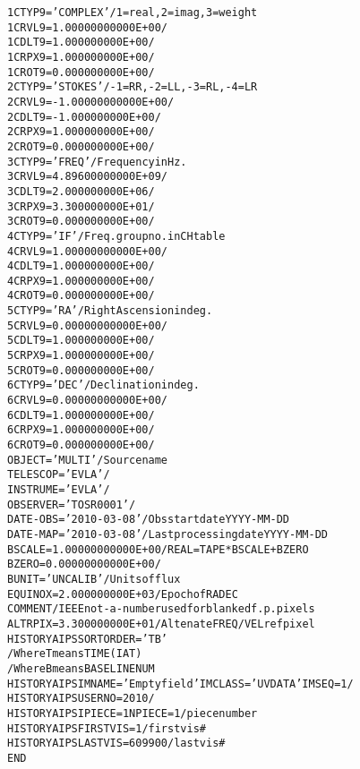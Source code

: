 \documentclass[twoside]{article}
\begin{document}
\begin{alltt}
1CTYP9  = 'COMPLEX '           / 1=real,2=imag,3=weight
1CRVL9  =    1.00000000000E+00 /
1CDLT9  =      1.000000000E+00 /
1CRPX9  =      1.000000000E+00 /
1CROT9  =      0.000000000E+00 /
2CTYP9  = 'STOKES  '           / -1=RR, -2=LL, -3=RL, -4=LR
2CRVL9  =   -1.00000000000E+00 /
2CDLT9  =     -1.000000000E+00 /
2CRPX9  =      1.000000000E+00 /
2CROT9  =      0.000000000E+00 /
3CTYP9  = 'FREQ    '           / Frequency in Hz.
3CRVL9  =    4.89600000000E+09 /
3CDLT9  =      2.000000000E+06 /
3CRPX9  =      3.300000000E+01 /
3CROT9  =      0.000000000E+00 /
4CTYP9  = 'IF      '           / Freq. group no. in CH table
4CRVL9  =    1.00000000000E+00 /
4CDLT9  =      1.000000000E+00 /
4CRPX9  =      1.000000000E+00 /
4CROT9  =      0.000000000E+00 /
5CTYP9  = 'RA      '           / Right Ascension in deg.
5CRVL9  =    0.00000000000E+00 /
5CDLT9  =      1.000000000E+00 /
5CRPX9  =      1.000000000E+00 /
5CROT9  =      0.000000000E+00 /
6CTYP9  = 'DEC     '           / Declination in deg.
6CRVL9  =    0.00000000000E+00 /
6CDLT9  =      1.000000000E+00 /
6CRPX9  =      1.000000000E+00 /
6CROT9  =      0.000000000E+00 /
OBJECT  = 'MULTI   '           / Source name
TELESCOP= 'EVLA    '           /
INSTRUME= 'EVLA    '           /
OBSERVER= 'TOSR0001'           /
DATE-OBS= '2010-03-08'         / Obs start date YYYY-MM-DD
DATE-MAP= '2010-03-08'         / Last processing date YYYY-MM-DD
BSCALE  =    1.00000000000E+00 / REAL = TAPE * BSCALE + BZERO
BZERO   =    0.00000000000E+00 /
BUNIT   = 'UNCALIB '           / Units of flux
EQUINOX =      2.000000000E+03 / Epoch of RA DEC
COMMENT / IEEE not-a-number used for blanked f.p. pixels
ALTRPIX =      3.300000000E+01 / Altenate FREQ/VEL ref pixel
HISTORY AIPS   SORT ORDER = 'TB'
              / Where T means TIME (IAT)
              / Where B means BASELINE NUM
HISTORY AIPS   IMNAME='Empty field ' IMCLASS='UVDATA' IMSEQ=   1     /
HISTORY AIPS   USERNO= 2010            /
HISTORY AIPS   IPIECE= 1 NPIECE= 1     / piece number
HISTORY AIPS   FIRSTVIS=           1     / first vis #
HISTORY AIPS   LASTVIS =      609900     / last vis #
END
\end{alltt}
\end{document}
